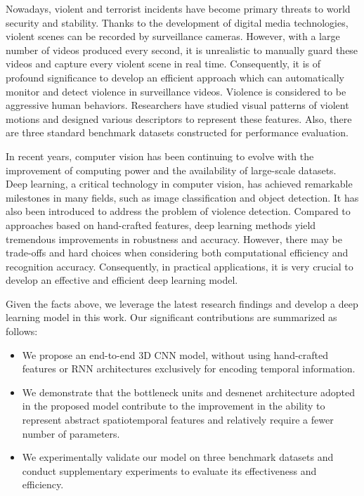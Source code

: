 \documentclass[10pt,twocolumn,letterpaper]{article}
\begin{document}
Nowadays, violent and terrorist incidents have become primary threats to world security and stability.
Thanks to the development of digital media technologies, violent scenes can be recorded by surveillance cameras.
However, with a large number of videos produced every second, it is unrealistic to manually guard these videos and capture every violent scene in real time.
Consequently, it is of profound significance to develop an efficient approach which can automatically monitor and detect violence in surveillance videos.
Violence is considered to be aggressive human behaviors.
Researchers have studied visual patterns of violent motions and designed various descriptors to represent these features.
Also, there are three standard benchmark datasets constructed for performance evaluation.

In recent years, computer vision has been continuing to evolve with the improvement of computing power and the availability of large-scale datasets.
Deep learning, a critical technology in computer vision, has achieved remarkable milestones in many fields, such as image classification and object detection.
It has also been introduced to address the problem of violence detection.
Compared to approaches based on hand-crafted features, deep learning methods yield tremendous improvements in robustness and accuracy.
However, there may be trade-offs and hard choices when considering both computational efficiency and recognition accuracy.
Consequently, in practical applications, it is very crucial to develop an effective and efficient deep learning model.

Given the facts above, we leverage the latest research findings and develop a deep learning model in this work.
Our significant contributions are summarized as follows:
\begin{itemize}
	\item We propose an end-to-end 3D CNN model, without using hand-crafted features or RNN architectures exclusively for encoding temporal information.
	\item We demonstrate that the bottleneck units and desnenet architecture adopted in the proposed model contribute to the improvement in the ability to represent abstract spatiotemporal features and relatively require a fewer number of parameters.
	\item We experimentally validate our model on three benchmark datasets and conduct supplementary experiments to evaluate its effectiveness and efficiency.
\end{itemize}
\end{document}

